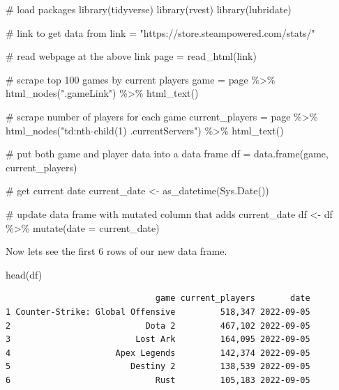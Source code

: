 \documentclass[
  letterpaper,
  DIV=11,
  numbers=noendperiod]{scrreprt}
\newenvironment{Shaded}{\begin{snugshade}}{\end{snugshade}}
\newcommand{\AttributeTok}[1]{\textcolor[rgb]{0.40,0.45,0.13}{#1}}
\newcommand{\CommentTok}[1]{\textcolor[rgb]{0.37,0.37,0.37}{#1}}
\newcommand{\FunctionTok}[1]{\textcolor[rgb]{0.28,0.35,0.67}{#1}}
\newcommand{\NormalTok}[1]{\textcolor[rgb]{0.00,0.23,0.31}{#1}}
\newcommand{\OtherTok}[1]{\textcolor[rgb]{0.00,0.23,0.31}{#1}}
\newcommand{\SpecialCharTok}[1]{\textcolor[rgb]{0.37,0.37,0.37}{#1}}
\newcommand{\StringTok}[1]{\textcolor[rgb]{0.13,0.47,0.30}{#1}}
\begin{document}
\begin{Shaded}
\begin{Highlighting}[]
\CommentTok{\# load packages}
\FunctionTok{library}\NormalTok{(tidyverse)}
\FunctionTok{library}\NormalTok{(rvest)}
\FunctionTok{library}\NormalTok{(lubridate)}

\CommentTok{\# link to get data from}
\NormalTok{link }\OtherTok{=} \StringTok{"https://store.steampowered.com/stats/"} 

\CommentTok{\# read webpage at the above link}
\NormalTok{page }\OtherTok{=} \FunctionTok{read\_html}\NormalTok{(link) }

\CommentTok{\# scrape top 100 games by current players}
\NormalTok{game }\OtherTok{=}\NormalTok{ page }\SpecialCharTok{\%\textgreater{}\%} \FunctionTok{html\_nodes}\NormalTok{(}\StringTok{".gameLink"}\NormalTok{) }\SpecialCharTok{\%\textgreater{}\%} \FunctionTok{html\_text}\NormalTok{()  }

\CommentTok{\# scrape number of players for each game }
\NormalTok{current\_players }\OtherTok{=}\NormalTok{ page }\SpecialCharTok{\%\textgreater{}\%} \FunctionTok{html\_nodes}\NormalTok{(}\StringTok{"td:nth{-}child(1) .currentServers"}\NormalTok{) }\SpecialCharTok{\%\textgreater{}\%} \FunctionTok{html\_text}\NormalTok{() }

\CommentTok{\# put both game and player data into a data frame}
\NormalTok{df }\OtherTok{=} \FunctionTok{data.frame}\NormalTok{(game, current\_players) }

\CommentTok{\# get current date}
\NormalTok{current\_date }\OtherTok{\textless{}{-}} \FunctionTok{as\_datetime}\NormalTok{(}\FunctionTok{Sys.Date}\NormalTok{())}

\CommentTok{\# update data frame with mutated column that adds current\_date}
\NormalTok{df }\OtherTok{\textless{}{-}}\NormalTok{ df }\SpecialCharTok{\%\textgreater{}\%} 
  \FunctionTok{mutate}\NormalTok{(}\AttributeTok{date =}\NormalTok{ current\_date)}
\end{Highlighting}
\end{Shaded}

Now lets see the first 6 rows of our new data frame.

\begin{Shaded}
\begin{Highlighting}[]
\FunctionTok{head}\NormalTok{(df)}
\end{Highlighting}
\end{Shaded}

\begin{verbatim}
                              game current_players       date
1 Counter-Strike: Global Offensive         518,347 2022-09-05
2                           Dota 2         467,102 2022-09-05
3                         Lost Ark         164,095 2022-09-05
4                     Apex Legends         142,374 2022-09-05
5                        Destiny 2         138,539 2022-09-05
6                             Rust         105,183 2022-09-05
\end{verbatim}
\end{document}
